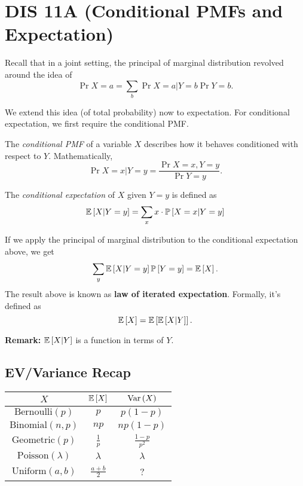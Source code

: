 \section{DIS 11A (Conditional PMFs and Expectation)}

Recall that in a joint setting, the principal of marginal distribution revolved around the idea of \[ \Pr{X = a} = \sum_{b} \Pr{X = a|Y = b} \Pr{Y = b}. \]

We extend this idea (of total probability) now to expectation. For conditional expectation, we first require the conditional PMF. 

\begin{definition}
    The \textit{conditional PMF} of a variable $X$ describes how it behaves conditioned with respect to $Y$. Mathematically, \[ \Pr{X=x|Y=y} = \frac{\Pr{X=x,Y=y}}{\Pr{Y=y}}. \]
\end{definition}

\begin{definition}
    The \textit{conditional expectation} of $X$ given $Y = y$ is defined as \[ \mathbb{E}\left[ X|Y=y \right] = \sum_{x} x \cdot \mathbb{P}\left[ X = x | Y = y \right]\]
\end{definition}

If we apply the principal of marginal distribution to the conditional expectation above, we get \[ \sum_{y} \mathbb{E}\left[ X|Y=y \right]\mathbb{P}\left[ Y=y \right] = \mathbb{E}\left[ X \right]. \]
The result above is known as \textbf{law of iterated expectation}. Formally, it's defined as \[ \mathbb{E}\left[ X \right] = \mathbb{E}\left[ \mathbb{E}\left[ X|Y \right] \right]. \]

\textbf{Remark:} $\mathbb{E}\left[ X|Y \right]$ is a function in terms of $Y$. 

\subsection{EV/Variance Recap}

\begin{center}
    \begin{tabular}{|c|c|c|}
        \hline 
        $X$ & $\mathbb{E}\left[ X \right]$ & $\text{Var}\left( X \right)$ \\
        \hline
        $\text{Bernoulli}(p)$ & $p$ & $p(1-p)$ \\
        \hline
        $\text{Binomial}(n,p)$ & $np$ & $np(1-p)$ \\
        \hline
        $\text{Geometric}(p)$ & $\frac{1}{p}$ & $\frac{1-p}{p^2}$ \\
        \hline
        $\text{Poisson}(\lambda)$ & $\lambda$ & $\lambda$ \\
        \hline
        $\text{Uniform}(a,b)$ & $\frac{a+b}{2}$ & ? \\
        \hline
    \end{tabular}
\end{center}